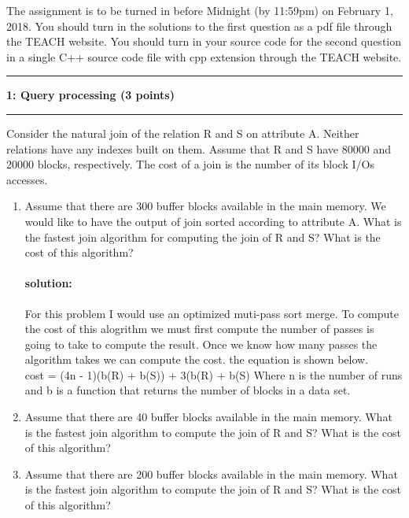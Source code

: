 \documentclass[11pt]{article}
\newcommand\question[2]{\vspace{.25in}\hrule\textbf{#1: #2}\vspace{.5em}\hrule\vspace{.10in}}
\begin{document}
\raggedright
\newcommand\NAME{Oregon State University}  %
\newcommand\ANDREWID{}     %
\newcommand\HWNUM{3}              %


The assignment is to be turned in before Midnight (by 11:59pm) on February 1, 2018. 
You should turn in the solutions to the first question as a pdf file through the TEACH website. You should turn in your source code 
for the second question in a single C++ source code file with cpp extension through the TEACH website.

\question{1}{Query processing (3 points)}
Consider the natural join of the relation R and S on attribute A. 
Neither relations have any indexes built on them. 
Assume that R and S have 80000 and 20000 blocks, respectively.
The cost of a join is the number of its block I/Os accesses.

\begin{enumerate}
\item Assume that there are 300 buffer blocks available in the main memory. 
We would like to have the output of join sorted according to attribute A. 
What is the fastest join algorithm for computing the join of R and S? What is the cost of this algorithm? 

\paragraph{solution:} \hfill \break
For this problem I would use an optimized muti-pass sort merge. To compute the cost of this alogrithm we must first compute the number of passes is going to take to compute the result. Once we know how many passes the algorithm takes we can compute the cost. the equation is shown below.\\

cost = (4n - 1)(b(R) + b(S)) + 3(b(R) + b(S) Where n is the number of runs and b is a function that returns the number of blocks in a data set.\\




\item Assume that there are 40 buffer blocks available in the main memory. 
What is the fastest join algorithm to compute the join of R and S? What is the cost of this algorithm? 


\item Assume that there are 200 buffer blocks available in the main memory. What is the fastest join 
algorithm to compute the join of R and S? What is the cost of this algorithm? 

\end{enumerate}
\end{document}

